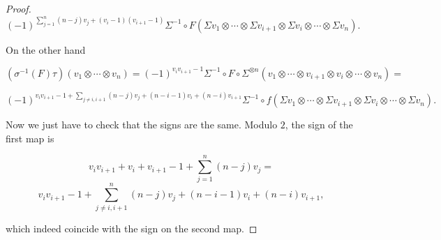 \documentclass[twoside]{article}
\begin{document}
\begin{proof}
$$(-1)^{\sum_{j=1}^n (n-j)v_j+(v_i-1)(v_{i+1}-1)}\Sigma^{-1}\circ F(\Sigma v_1\otimes\cdots\otimes\Sigma v_{i+1}\otimes\Sigma v_i\otimes\cdots\otimes \Sigma v_n).$$

On the other hand

$$(\sigma^{-1}(F)\tau) (v_1\otimes\cdots\otimes v_n)=(-1)^{v_iv_{i+1}-1}\Sigma^{-1}\circ F\circ \Sigma^{\otimes n}(v_1\otimes\cdots\otimes v_{i+1}\otimes v_i\otimes\cdots\otimes v_n)=$$

$$(-1)^{v_iv_{i+1}-1+\sum_{j\neq i,i+1}(n-j)v_j +(n-i-1)v_i+(n-i)v_{i+1}}\Sigma^{-1}\circ f(\Sigma v_1\otimes\cdots\otimes \Sigma v_{i+1}\otimes \Sigma v_i\otimes\cdots\otimes \Sigma v_n).$$

Now we just have to check that the signs are the same. Modulo $2$, the sign of the first map is

$$v_iv_{i+1}+v_i+v_{i+1}-1+\sum_{j=1}^n(n-j)v_j=$$
$$v_iv_{i+1}-1+\sum_{j\neq i,i+1}^n(n-j)v_j+(n-i-1)v_i+(n-i)v_{i+1},$$

which indeed coincide with the sign on the second map.

\end{proof}
\end{document}
